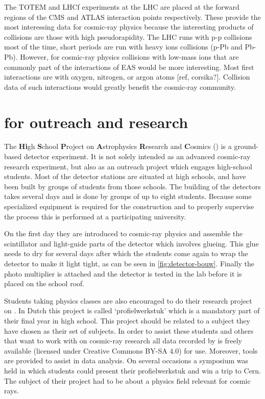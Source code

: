 The TOTEM and LHCf experiments at the LHC are placed at the forward regions of the CMS and ATLAS interaction points respectively. These provide the most interessing data for cosmic-ray physics because the interesting products of collisions are those with high pseudorapidity. The LHC runs with p-p collisions most of the time, short periods are run with heavy ions collisions (p-Pb and Pb-Pb). However, for cosmic-ray physics collisions with low-mass ions that are commonly part of the interactions of EAS would be more interesting. Most first interactions are with oxygen, nitrogen, or argon atoms [ref, corsika?]. Collision data of such interactions would greatly benefit the cosmic-ray community.


\section{\hisparc for outreach and research}

The \textbf{Hi}gh \textbf{S}chool \textbf{P}roject on \textbf{A}strophysics \textbf{R}esearch and \textbf{C}osmics (\hisparc) is a ground-based detector experiment. It is not solely intended as an advanced cosmic-ray research experiment, but also as an outreach project which engages high-school students. Most of the \hisparc detector stations are situated at high schools, and have been built by groups of students from those schools. The building of the detectors takes several days and is done by groups of up to eight students. Because some specialized equipment is required for the construction and to properly supervise the process this is performed at a participating university.

On the first day they are introduced to cosmic-ray physics and assemble the scintillator and light-guide parts of the detector which involves glueing. This glue needs to dry for several days after which the students come again to wrap the detector to make it light tight, as can be seen in \cref{fig:detector-bouw}. Finally the photo multiplier is attached and the detector is tested in the lab before it is placed on the school roof.

Students taking physics classes are also encouraged to do their research project on \hisparc. In Dutch this project is called `profielwerkstuk' which is a mandatory part of their final year in high school. This project should be related to a subject they have chosen as their set of subjects. In order to assist these students and others that want to work with on cosmic-ray research all data recorded by \hisparc is freely available (licensed under Creative Commons BY-SA 4.0) for use. Moreover, tools are provided to assist in data analysis. On several occasions a symposium was held in which students could present their profielwerkstuk and win a trip to Cern. The subject of their project had to be about a physics field relevant for cosmic rays.

